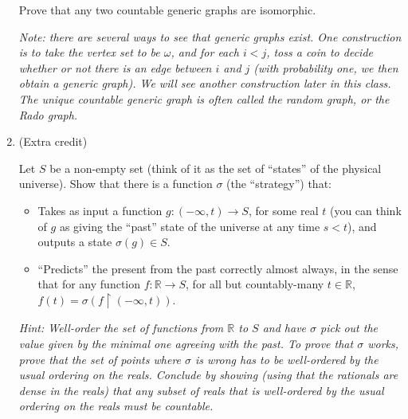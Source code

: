 \documentclass{amsart}
\theoremstyle{definition}
\newcommand{\rest}{\upharpoonright}
\begin{document}
\begin{enumerate}
  Prove that any two countable generic graphs are isomorphic.

  \emph{Note: there are several ways to see that generic graphs exist. One construction is to take the vertex set to be $\omega$, and for each $i < j$, toss a coin to decide whether or not there is an edge between $i$ and $j$ (with probability one, we then obtain a generic graph). We will see another construction later in this class. The unique countable generic graph is often called the random graph, or the Rado graph.}

\item (Extra credit) 

  Let $S$ be a non-empty set (think of it as the set of ``states'' of the physical universe). Show that there is a function $\sigma$ (the ``strategy'') that:
  \begin{itemize}
  \item Takes as input a function $g: (-\infty, t) \to S$, for some real $t$ (you can think of $g$ as giving the ``past'' state of the universe at any time $s < t$), and outputs a state $\sigma (g) \in S$.
  \item ``Predicts'' the present from the past correctly almost always, in the sense that for any function $f: \mathbb{R} \to S$, for all but countably-many $t \in \mathbb{R}$, $f (t) = \sigma (f \rest (-\infty, t))$.
  \end{itemize}

  \emph{Hint: Well-order the set of functions from $\mathbb{R}$ to $S$ and have $\sigma$ pick out the value given by the minimal one agreeing with the past. To prove that $\sigma$ works, prove that the set of points where $\sigma$ is wrong has to be well-ordered by the usual ordering on the reals. Conclude by showing (using that the rationals are dense in the reals) that any subset of reals that is well-ordered by the usual ordering on the reals must be countable.}
\end{enumerate}



\end{document}
